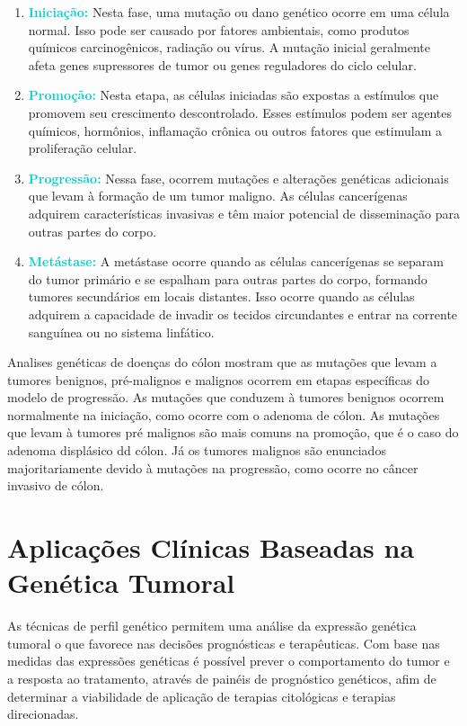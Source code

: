 \documentclass[11pt,a4paper]{article}
\begin{document}
    \begin{enumerate}
        \item \textcolor{DarkTurquoise}{\textbf{Iniciação:}} Nesta fase, uma mutação ou dano genético ocorre em uma célula normal. Isso pode ser causado por fatores ambientais, como produtos químicos carcinogênicos, radiação ou vírus. A mutação inicial geralmente afeta genes supressores de tumor ou genes reguladores do ciclo celular.
        \item \textcolor{DarkTurquoise}{\textbf{Promoção:}} Nesta etapa, as células iniciadas são expostas a estímulos que promovem seu crescimento descontrolado. Esses estímulos podem ser agentes químicos, hormônios, inflamação crônica ou outros fatores que estimulam a proliferação celular.
        \item \textcolor{DarkTurquoise}{\textbf{Progressão:}} Nessa fase, ocorrem mutações e alterações genéticas adicionais que levam à formação de um tumor maligno. As células cancerígenas adquirem características invasivas e têm maior potencial de disseminação para outras partes do corpo.
        \item \textcolor{DarkTurquoise}{\textbf{Metástase:}} A metástase ocorre quando as células cancerígenas se separam do tumor primário e se espalham para outras partes do corpo, formando tumores secundários em locais distantes. Isso ocorre quando as células adquirem a capacidade de invadir os tecidos circundantes e entrar na corrente sanguínea ou no sistema linfático.
    \end{enumerate}

    Analises genéticas de doenças do cólon mostram que as mutações que levam a tumores benignos, pré-malignos e malignos ocorrem em etapas específicas do modelo de progressão. As mutações que conduzem à tumores benignos ocorrem normalmente na iniciação, como ocorre com o adenoma de cólon. As mutações que levam à tumores pré malignos são mais comuns na promoção, que é o caso do adenoma displásico dd cólon. Já os tumores malignos são enunciados majoritariamente devido à mutações na progressão, como ocorre no câncer invasivo de cólon. 


\section{Aplicações Clínicas Baseadas na Genética Tumoral}

    As técnicas de perfil genético permitem uma análise da expressão genética tumoral o que favorece nas decisões prognósticas e terapêuticas. Com base nas medidas das expressões genéticas é possível prever o comportamento do tumor e a resposta ao tratamento, através de painéis de prognóstico genéticos, afim de determinar a viabilidade de aplicação de terapias citológicas e terapias direcionadas.
\end{document}
